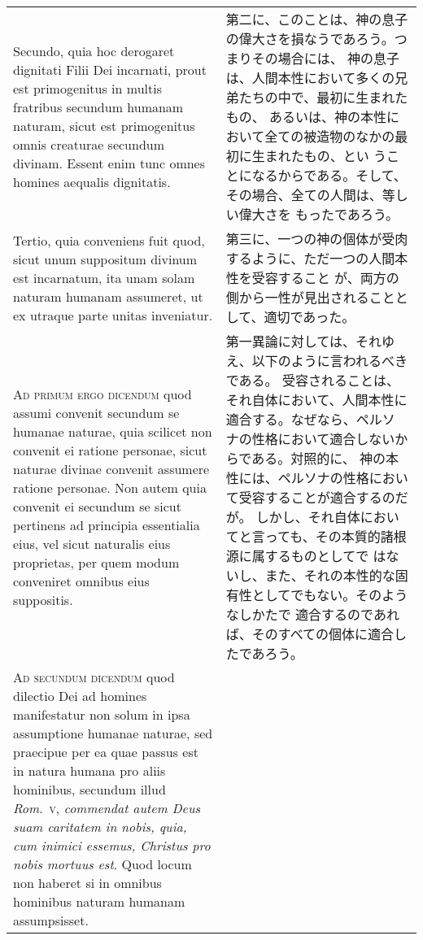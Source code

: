 \documentclass[10pt]{jsarticle} %
\begin{document}
\begin{longtable}{p{21em}p{21em}}
Secundo, quia hoc
derogaret dignitati Filii Dei incarnati, prout est primogenitus in
multis fratribus secundum humanam naturam, sicut est primogenitus omnis
creaturae secundum divinam. Essent enim tunc omnes homines aequalis
dignitatis. 

&

第二に、このことは、神の息子の偉大さを損なうであろう。つまりその場合には、
 神の息子は、人間本性において多くの兄弟たちの中で、最初に生まれたもの、
 あるいは、神の本性において全ての被造物のなかの最初に生まれたもの、とい
 うことになるからである。そして、その場合、全ての人間は、等しい偉大さを
 もったであろう。


\\

Tertio, quia conveniens fuit quod, sicut unum suppositum
divinum est incarnatum, ita unam solam naturam humanam assumeret, ut ex
utraque parte unitas inveniatur.


&

第三に、一つの神の個体が受肉するように、ただ一つの人間本性を受容すること
 が、両方の側から一性が見出されることとして、適切であった。

\\



{\scshape Ad primum ergo dicendum} quod assumi convenit secundum se humanae
naturae, quia scilicet non convenit ei ratione personae, sicut naturae
divinae convenit assumere ratione personae. Non autem quia convenit ei
secundum se sicut pertinens ad principia essentialia eius, vel sicut
naturalis eius proprietas, per quem modum conveniret omnibus eius
suppositis.


&

第一異論に対しては、それゆえ、以下のように言われるべきである。
受容されることは、それ自体において、人間本性に適合する。なぜなら、ペルソ
 ナの性格において適合しないからである。対照的に、
神の本性には、ペルソナの性格において受容することが適合するのだが。
しかし、それ自体においてと言っても、その本質的諸根源に属するものとしてで
 はないし、また、それの本性的な固有性としてでもない。そのようなしかたで
 適合するのであれば、そのすべての個体に適合したであろう。


\\



{\scshape Ad secundum dicendum} quod dilectio Dei ad homines manifestatur non solum
in ipsa assumptione humanae naturae, sed praecipue per ea quae passus
est in natura humana pro aliis hominibus, secundum illud {\itshape Rom}.~{\scshape v},
{\itshape commendat autem Deus suam caritatem in nobis, quia, cum inimici essemus,
Christus pro nobis mortuus est}. Quod locum non haberet si in omnibus
hominibus naturam humanam assumpsisset.



\end{longtable}
\end{document}
